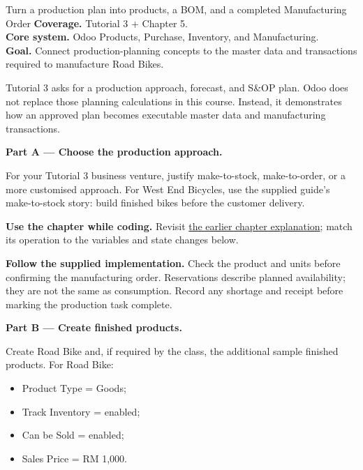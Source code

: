 
\begin{labproject}{Turn a production plan into products, a BOM, and a completed Manufacturing Order}
\textbf{Coverage.} Tutorial 3 + Chapter 5.\\
\textbf{Core system.} Odoo Products, Purchase, Inventory, and Manufacturing.\\
\textbf{Goal.} Connect production-planning concepts to the master data and transactions required to manufacture Road Bikes.




\begin{labmode}
Tutorial 3 asks for a production approach, forecast, and S\&OP plan. Odoo does not replace those planning calculations in this course. Instead, it demonstrates how an approved plan becomes executable master data and manufacturing transactions.
\end{labmode}

\medskip\noindent\textbf{Part A --- Choose the production approach.}

For your Tutorial 3 business venture, justify make-to-stock, make-to-order, or a more customised approach. For West End Bicycles, use the supplied guide's make-to-stock story: build finished bikes before the customer delivery.




\textbf{Use the chapter while coding.} Revisit \hyperref[ch:production-planning]{the earlier chapter explanation}; match its operation to the variables and state changes below.

\textbf{Follow the supplied implementation.} Check the product and units before confirming the manufacturing order. Reservations describe planned availability; they are not the same as consumption. Record any shortage and receipt before marking the production task complete.


\medskip\noindent\textbf{Part B --- Create finished products.}

Create Road Bike and, if required by the class, the additional sample finished products. For Road Bike:
\begin{itemize}
  \item Product Type = Goods;
  \item Track Inventory = enabled;
  \item Can be Sold = enabled;
  \item Sales Price = RM 1,000.
\end{itemize}


\end{labproject}
